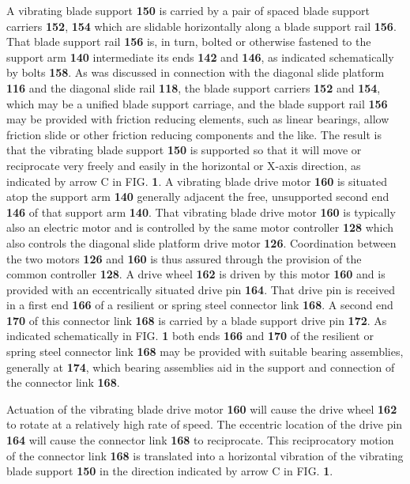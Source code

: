 \documentclass{article}
\begin{document}
A vibrating blade support \textbf{150} is carried by a pair of spaced blade support carriers \textbf{152}, \textbf{154} which are slidable horizontally along a blade support rail \textbf{156}. That blade support rail \textbf{156} is, in turn, bolted or otherwise fastened to the support arm \textbf{140} intermediate its ends \textbf{142} and \textbf{146}, as indicated schematically by bolts \textbf{158}. As was discussed in connection with the diagonal slide platform \textbf{116} and the diagonal slide rail \textbf{118}, the blade support carriers \textbf{152} and \textbf{154}, which may be a unified blade support carriage, and the blade support rail \textbf{156} may be provided with friction reducing elements, such as linear bearings, allow friction slide or other friction reducing components and the like. The result is that the vibrating blade support \textbf{150} is supported so that it will move or reciprocate very freely and easily in the horizontal or X-axis direction, as indicated by arrow C in FIG. \textbf{1}. A vibrating blade drive motor \textbf{160} is situated atop the support arm \textbf{140} generally adjacent the free, unsupported second end \textbf{146} of that support arm \textbf{140}. That vibrating blade drive motor \textbf{160} is typically also an electric motor and is controlled by the same motor controller \textbf{128} which also controls the diagonal slide platform drive motor \textbf{126}. Coordination between the two motors \textbf{126} and \textbf{160} is thus assured through the provision of the common controller \textbf{128}. A drive wheel \textbf{162} is driven by this motor \textbf{160} and is provided with an eccentrically situated drive pin \textbf{164}. That drive pin is received in a first end \textbf{166} of a resilient or spring steel connector link \textbf{168}. A second end \textbf{170} of this connector link \textbf{168} is carried by a blade support drive pin \textbf{172}. As indicated schematically in FIG. \textbf{1} both ends \textbf{166} and \textbf{170} of the resilient or spring steel connector link \textbf{168} may be provided with suitable bearing assemblies, generally at \textbf{174}, which bearing assemblies aid in the support and connection of the connector link \textbf{168}.

Actuation of the vibrating blade drive motor \textbf{160} will cause the drive wheel \textbf{162} to rotate at a relatively high rate of speed. The eccentric location of the drive pin \textbf{164} will cause the connector link \textbf{168} to reciprocate. This reciprocatory motion of the connector link \textbf{168} is translated into a horizontal vibration of the vibrating blade support \textbf{150} in the direction indicated by arrow C in FIG. \textbf{1}.
\end{document}
